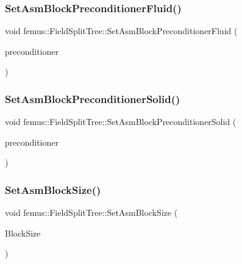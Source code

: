 \subsubsection{\texorpdfstring{Set\+Asm\+Block\+Preconditioner\+Fluid()}{SetAsmBlockPreconditionerFluid()}}
{\footnotesize\ttfamily void femus\+::\+Field\+Split\+Tree\+::\+Set\+Asm\+Block\+Preconditioner\+Fluid (\begin{DoxyParamCaption}\item[{const \mbox{\hyperlink{_precondtype_enum_8hpp_a8b341faac6531c4543c9dc6e5e4592cf}{Preconditioner\+Type}} \&}]{preconditioner }\end{DoxyParamCaption})\hspace{0.3cm}{\ttfamily [inline]}}

\mbox{\label{classfemus_1_1_field_split_tree_ae2dd031e6279f74a7bc6fc41a43ff6c9}} 
\subsubsection{\texorpdfstring{Set\+Asm\+Block\+Preconditioner\+Solid()}{SetAsmBlockPreconditionerSolid()}}
{\footnotesize\ttfamily void femus\+::\+Field\+Split\+Tree\+::\+Set\+Asm\+Block\+Preconditioner\+Solid (\begin{DoxyParamCaption}\item[{const \mbox{\hyperlink{_precondtype_enum_8hpp_a8b341faac6531c4543c9dc6e5e4592cf}{Preconditioner\+Type}} \&}]{preconditioner }\end{DoxyParamCaption})\hspace{0.3cm}{\ttfamily [inline]}}

\mbox{\label{classfemus_1_1_field_split_tree_a22a00437c2e18998fe3ebda9770234ce}} 
\subsubsection{\texorpdfstring{Set\+Asm\+Block\+Size()}{SetAsmBlockSize()}}
{\footnotesize\ttfamily void femus\+::\+Field\+Split\+Tree\+::\+Set\+Asm\+Block\+Size (\begin{DoxyParamCaption}\item[{const unsigned \&}]{Block\+Size }\end{DoxyParamCaption})\hspace{0.3cm}{\ttfamily [inline]}}

